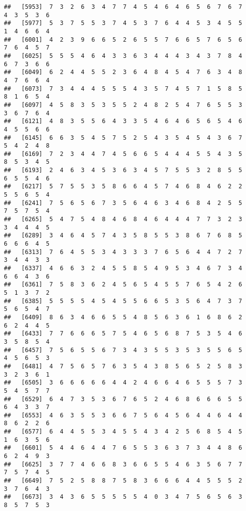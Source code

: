 \documentclass[
]{book}
\begin{document}
\begin{verbatim}
##   [5953]  7  3  2  6  3  4  7  7  4  5  4  6  4  6  5  6  7  6  7  4  3  5  3  6
##   [5977]  5  3  7  5  5  3  7  4  5  3  7  6  4  4  5  3  4  5  5  1  4  6  6  4
##   [6001]  4  2  3  9  6  6  5  2  6  5  5  7  6  6  5  7  6  5  6  7  6  4  5  7
##   [6025]  5  5  5  4  6  4  3  3  6  3  4  4  4  3  4  3  7  8  4  6  7  3  6  6
##   [6049]  6  2  4  4  5  5  2  3  6  4  8  4  5  4  7  6  3  4  8  4  7  6  6  4
##   [6073]  7  3  4  4  4  5  5  5  4  3  5  7  4  5  7  1  5  8  5  8  1  6  5  4
##   [6097]  4  5  8  3  5  3  5  5  2  4  8  2  5  4  7  6  5  5  3  3  6  7  6  4
##   [6121]  4  8  3  5  5  6  4  3  3  5  4  6  4  6  5  6  5  4  6  4  5  5  6  6
##   [6145]  6  6  3  5  4  5  7  5  2  5  4  3  5  4  5  4  3  6  7  5  4  2  4  8
##   [6169]  7  2  3  4  4  7  4  5  6  6  5  4  4  4  5  5  4  3  5  8  5  3  4  5
##   [6193]  2  4  6  3  4  5  3  6  3  4  5  7  5  5  3  2  8  5  5  6  5  5  4  6
##   [6217]  5  7  5  5  3  5  8  6  6  4  5  7  4  6  8  4  6  2  2  5  5  6  5  4
##   [6241]  7  5  6  5  6  7  3  5  6  4  6  3  4  6  8  4  2  5  5  7  5  7  5  4
##   [6265]  5  4  7  5  4  8  4  6  8  4  6  4  4  4  7  7  3  2  3  3  4  4  4  5
##   [6289]  3  4  6  4  5  7  4  3  5  8  5  5  3  8  6  7  6  8  5  6  6  6  4  5
##   [6313]  7  6  4  5  5  3  4  3  3  3  7  6  5  6  4  4  7  2  7  3  4  4  3  3
##   [6337]  4  6  6  3  2  4  5  5  8  5  4  9  5  3  4  6  7  3  4  6  6  4  3  6
##   [6361]  7  5  8  3  6  2  4  5  6  5  4  5  5  7  6  5  4  2  6  5  1  3  7  2
##   [6385]  5  5  5  5  4  5  4  5  5  6  6  5  3  5  6  4  7  3  7  5  6  5  4  7
##   [6409]  8  6  3  4  6  6  5  5  4  8  5  6  3  6  1  6  8  6  2  6  2  4  4  5
##   [6433]  7  7  6  6  6  5  7  5  4  6  5  6  8  7  5  3  5  4  6  3  5  8  5  4
##   [6457]  7  5  6  5  5  6  7  3  4  3  5  5  3  5  3  5  5  6  5  4  5  6  5  3
##   [6481]  4  7  5  6  5  7  6  3  5  4  3  8  5  6  5  2  5  8  3  3  2  3  6  1
##   [6505]  3  6  6  6  6  6  4  4  2  4  6  6  4  6  5  5  5  7  3  5  4  5  7  7
##   [6529]  6  4  7  3  5  3  6  7  6  5  2  4  6  8  6  6  6  5  5  6  4  3  3  7
##   [6553]  4  6  3  5  5  3  6  6  7  5  6  4  5  6  4  4  6  4  4  8  6  2  2  6
##   [6577]  6  4  4  5  5  3  4  5  5  4  3  4  2  5  6  8  5  4  5  1  6  3  5  6
##   [6601]  5  4  4  6  4  4  7  6  5  5  3  6  3  7  3  4  4  8  6  6  2  4  9  3
##   [6625]  3  7  7  4  6  6  8  3  6  6  5  5  4  6  3  5  6  7  7  7  5  7  4  5
##   [6649]  7  5  2  5  8  8  7  5  8  3  6  6  6  4  4  5  5  5  2  3  7  6  4  3
##   [6673]  3  4  3  6  5  5  5  5  5  4  0  3  4  7  5  6  5  6  3  8  5  7  5  3

\end{verbatim}
\end{document}
